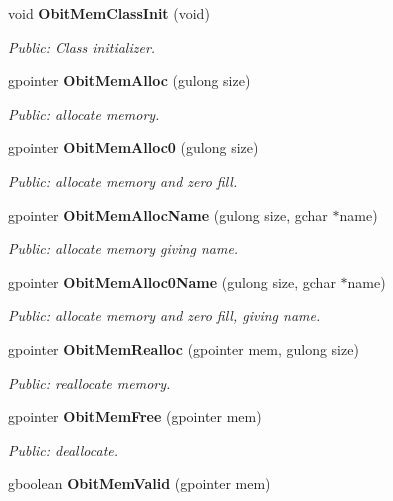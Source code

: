 \begin{CompactItemize}
\item 
void {\bf Obit\-Mem\-Class\-Init} (void)
\begin{CompactList}\small\item\em Public: Class initializer. \item\end{CompactList}\item 
gpointer {\bf Obit\-Mem\-Alloc} (gulong size)
\begin{CompactList}\small\item\em Public: allocate memory. \item\end{CompactList}\item 
gpointer {\bf Obit\-Mem\-Alloc0} (gulong size)
\begin{CompactList}\small\item\em Public: allocate memory and zero fill. \item\end{CompactList}\item 
gpointer {\bf Obit\-Mem\-Alloc\-Name} (gulong size, gchar $\ast$name)
\begin{CompactList}\small\item\em Public: allocate memory giving name. \item\end{CompactList}\item 
gpointer {\bf Obit\-Mem\-Alloc0Name} (gulong size, gchar $\ast$name)
\begin{CompactList}\small\item\em Public: allocate memory and zero fill, giving name. \item\end{CompactList}\item 
gpointer {\bf Obit\-Mem\-Realloc} (gpointer mem, gulong size)
\begin{CompactList}\small\item\em Public: reallocate memory. \item\end{CompactList}\item 
gpointer {\bf Obit\-Mem\-Free} (gpointer mem)
\begin{CompactList}\small\item\em Public: deallocate. \item\end{CompactList}\item 
gboolean {\bf Obit\-Mem\-Valid} (gpointer mem)

\end{CompactItemize}
